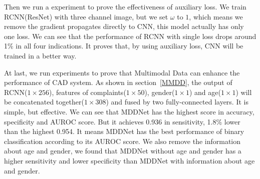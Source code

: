 \documentclass[journal]{IEEEtran}
\begin{document}
Then we run a experiment to prove the effectiveness of auxiliary loss. We train RCNN(ResNet) with three channel image, but we set $\omega$ to $1$, which means we remove the gradient propagates directly to CNN, this model actually has only one loss. We can see that the performance of RCNN with single loss drops around 1\% in all four indications. It proves that, by using auxiliary loss, CNN will be trained in a better way. 

At last, we run experiments to prove that Multimodal Data can enhance the performance of CAD system. As shown in section~\ref{MMDD}, the output of RCNN($1 \times 256$), features of complaints($1 \times 50$), gender($1 \times 1$) and age($1 \times 1$) will be concatenated together($1 \times 308$) and fused by two fully-connected layers. It is simple, but effective. We can see that MDDNet has the highest score in accuracy, specificity and AUROC score. But it achieves 0.936 in sensitivity, 1.8\% lower than the highest 0.954. It means MDDNet has the best performance of binary classification according to its AUROC score. We also remove the information about age and gender, we found that MDDNet without age and gender has a higher sensitivity and lower specificity than MDDNet with information about age and gender. 
\end{document}
